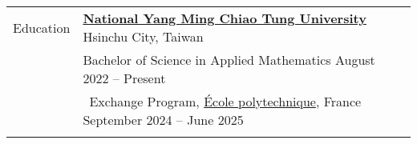 \documentclass[letterpaper, 11pt]{article}
\begin{document}
\setlength{\tabcolsep}{8pt}
\vspace{-1.5em}
\begin{center}
    \begin{longtable}{p{0.76in}p{5.93in}}

        
        
        
        \textcolor{OliveGreen}{Education} 
        & \href{https://www.nycu.edu.tw/nycu/en/index}{\textbf{National Yang Ming Chiao Tung University}} \hfill Hsinchu City, Taiwan \\ 
        & Bachelor of Science in Applied Mathematics 
            \hfill August 2022 -- Present \\
        & \qquad \  Exchange Program, \href{https://www.polytechnique.edu}{\'Ecole polytechnique}, France \hfill September 2024 -- June 2025 \\
        & \\
        
        
        

\end{longtable}
\end{center}
\end{document}
